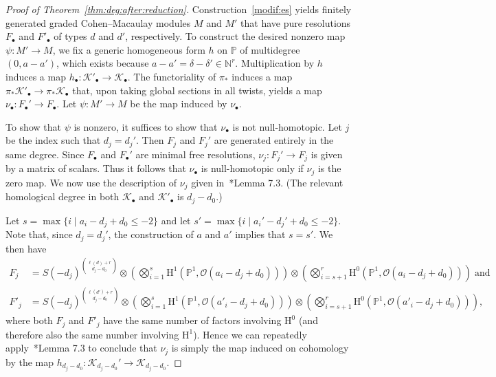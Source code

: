 \documentclass[12pt]{amsart}
\theoremstyle{definition}
\newcommand{\Hs}{\mathrm{H}}
\newcommand{\KK}{\mathcal{K}}
\newcommand{\cO}{{\mathcal O}}
\newcommand{\PP}{\mathbb{P}}
\newcommand{\NN}{\mathbb{N}}
\begin{document}
\begin{proof}[Proof of Theorem~\ref{thm:deg:after:reduction}]
Construction~\ref{modif:es} yields 
finitely generated graded Cohen--Macaulay modules $M$ and $M'$ 
that have pure resolutions $F_\bullet$ and $F'_\bullet$ of types $d$ and
$d'$, respectively. 
To construct the desired nonzero map $\psi\colon M'\to M$, 
we fix a generic homogeneous form $h$ on $\PP$ of multidegree
$(0,a-a')$, which exists because $a-a' = \delta - \delta'\in\NN^r$. Multiplication by $h$ induces a map 
$h_\bullet\colon  \KK'_\bullet \to \KK_\bullet$. 
The functoriality of $\pi_*$ induces a map 
$\pi_*\KK'_\bullet\to\pi_*\KK_\bullet$ that, 
upon taking global sections in all twists, yields a map
$\nu_\bullet\colon  F_\bullet' \to F_\bullet$. 
Let $\psi \colon M'\to M$ be the map induced by $\nu_\bullet$. 

To show that $\psi$ is nonzero, it suffices to show that $\nu_\bullet$
is not null-homotopic.  Let $j$ be the index such that $d_j=d_j'$.
Then $F_j$ and $F_j'$ are generated entirely in the same degree.
Since $F_\bullet$ and $F_\bullet'$ are minimal free resolutions,
$\nu_j\colon F_j'\to F_j$ is given by a matrix of scalars.  Thus it
follows that $\nu_\bullet$ is null-homotopic only if $\nu_j$ is the
zero map.  We now use the description of $\nu_j$ given
in~\cite{explicit}*{Lemma 7.3}. (The relevant homological degree in
both $\KK_\bullet$ and $\KK'_\bullet$ is $d_j-d_0$.)

Let $s=\max\{i \mid a_i-d_j+d_0\leq -2\}$ and let $s'=\max\{i \mid
a_i'-d_j'+d_0\leq -2\}$.  Note that, since $d_j=d_j'$, the construction of
$a$ and $a'$ implies that $s=s'$.  We then have
\begin{align*}
  F_j & = S(-d_j)^{\binom{\ell(d)+r}{d_j-d_0}}\otimes \left(
    \bigotimes_{i=1}^s \Hs^1(\PP^1, \cO(a_i-d_j+d_0)) \right) \otimes
  \left( \bigotimes_{i=s+1}^r \Hs^0(\PP^1, \cO(a_i-d_j+d_0)) \right) \; \text{and} \\
  F'_j & = S(-d_j)^{\binom{\ell(d')+r}{d_j-d_0}}\otimes \left(
    \bigotimes_{i=1}^{s} \Hs^1(\PP^1, \cO(a'_i-d_j+d_0)) \right) \otimes
  \left( \bigotimes_{i=s+1}^{r} \Hs^0(\PP^1, \cO(a'_i-d_j+d_0)) \right),
\end{align*}
where both $F_j$ and $F'_j$ have the same number of factors involving
$\Hs^0$ (and therefore also the same number involving $\Hs^1$).  Hence
we can repeatedly apply~\cite{explicit}*{Lemma 7.3} to conclude that
$\nu_j$ is simply the map induced on cohomology by the map
$h_{d_j-d_0}\colon \mathcal K_{d_j-d_0}'\to \mathcal K_{d_j-d_0}$.


\end{proof}
\end{document}
